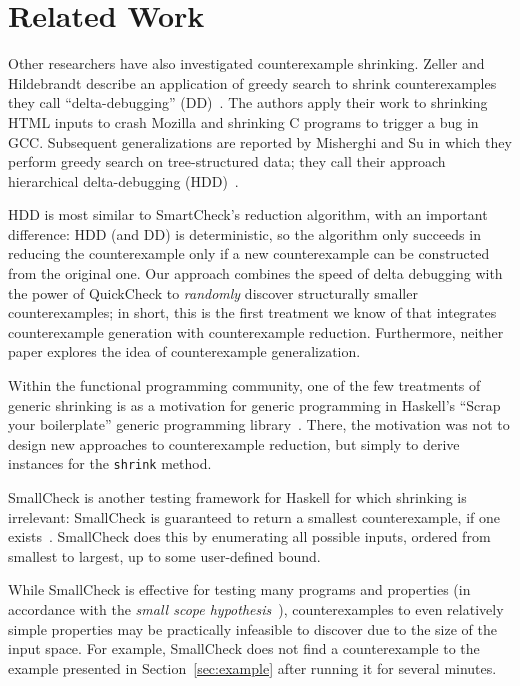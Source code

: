 \documentclass{sigplanconf}
\newcommand{\ttp}[1]{\texttt{#1}}
\begin{document}
\section{Related Work}\label{sec:related}

Other researchers have also investigated counterexample shrinking.  Zeller
and Hildebrandt describe an application of greedy search to shrink
counterexamples they call ``delta-debugging'' (DD)~\cite{dd}.  The authors apply
their work to shrinking HTML inputs to crash Mozilla and shrinking C programs to
trigger a bug in GCC.  Subsequent generalizations are reported by Misherghi and
Su in which they perform greedy search on tree-structured data; they call their
approach hierarchical delta-debugging (HDD)~\cite{hdd}.

HDD is most similar to SmartCheck's reduction algorithm, with an important
difference: HDD (and DD) is deterministic, so the algorithm only succeeds in
reducing the counterexample only if a new counterexample can be constructed from
the original one.  Our approach combines the speed of delta debugging with the
power of QuickCheck to \emph{randomly} discover structurally smaller
counterexamples; in short, this is the first treatment we know of that
integrates counterexample generation with counterexample reduction.
Furthermore, neither paper explores the idea of counterexample generalization.

Within the functional programming community, one of the few treatments of
generic shrinking is as a motivation for generic programming in Haskell's
``Scrap your boilerplate'' generic programming library~\cite{syb}.  There, the
motivation was not to design new approaches to counterexample reduction, but
simply to derive instances for the \ttp{shrink} method.

SmallCheck is another testing framework for Haskell for which shrinking is
irrelevant: SmallCheck is guaranteed to return a smallest counterexample, if
one exists~\cite{sc}.  SmallCheck does this by enumerating all possible inputs,
ordered from smallest to largest, up to some user-defined bound.

While SmallCheck is effective for testing many programs and properties (in
accordance with the \emph{small scope hypothesis}~\cite{jackson}),
counterexamples to even relatively simple properties may be practically
infeasible to discover due to the size of the input space.  For example,
SmallCheck does not find a counterexample to the example presented in
Section~\ref{sec:example} after running it for several minutes.
\end{document}
